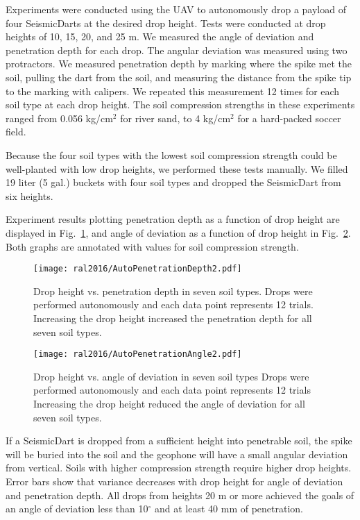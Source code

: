 Experiments were conducted using the UAV to autonomously drop a payload of four SeismicDarts at the desired drop height.
Tests were conducted at drop heights of 10, 15, 20, and 25 m.
We measured the angle of deviation and penetration depth for each drop.
The angular deviation was measured using two protractors.
We measured penetration depth by marking where the spike met the soil, pulling the dart from the soil, and measuring the distance from the spike tip to the marking with calipers.
We repeated this measurement 12 times for each soil type at each drop height.
The soil compression strengths in these experiments ranged from 0.056 kg/cm$^2$ for river sand, to 4 kg/cm$^2$ for a hard-packed soccer field.

Because the four soil types with the lowest soil compression strength could be well-planted with low drop heights, we performed these tests manually.
We filled 19 liter (5 gal.) buckets with four soil types and dropped the SeismicDart from six heights.

Experiment results plotting penetration depth as a function of drop height are displayed in Fig.~\ref{fig:DepthPlotIndoors}, and angle of deviation as a function of drop height in Fig.~\ref{fig:AnglePlotIndoors}.
Both graphs are annotated with values for soil compression strength.

\begin{figure} \centering
	{\texttt{[image: ral2016/AutoPenetrationDepth2.pdf]}}
	\caption{
		Drop height vs. penetration depth in seven soil types.
		Drops were performed autonomously and each data point represents 12 trials.
		Increasing the drop height increased the penetration depth for all seven soil types.}
	\label{fig:DepthPlotIndoors}
\end{figure}

\begin{figure} \centering
	{\texttt{[image: ral2016/AutoPenetrationAngle2.pdf]}}
	\caption{
		Drop height vs. angle of deviation in seven soil types
		Drops were performed autonomously and each data point represents 12 trials
		Increasing the drop height reduced the angle of deviation for all seven soil types.}
	\label{fig:AnglePlotIndoors}
	\vspace{-1em}
\end{figure}

If a SeismicDart is dropped from a sufficient height into penetrable soil, the spike will be buried into the soil and the geophone will have a small angular deviation from vertical.
Soils with higher compression strength require higher drop heights.
Error bars show that variance decreases with drop height for angle of deviation and penetration depth.
All drops from heights 20 m or more achieved the goals of an angle of deviation less than 10$^\circ$ and at least 40 mm of penetration.


